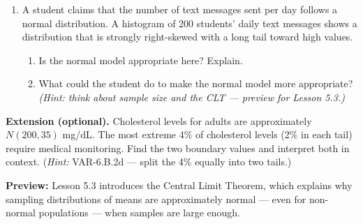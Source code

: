\documentclass[10pt]{article}
\begin{document}
\begin{enumerate}
  \boxguard[22]
  \item A student claims that the number of text messages sent per day follows a normal
        distribution. A histogram of 200 students' daily text messages shows a
        distribution that is strongly right-skewed with a long tail toward high values.
        \begin{enumerate}[label=\alph*.]
          \item Is the normal model appropriate here? Explain.
          \boxguard[17]
          \item What could the student do to make the normal model more appropriate?
                \textit{(Hint: think about sample size and the CLT --- preview for
                Lesson 5.3.)}
        \end{enumerate}

\end{enumerate}

\begin{extensionbox}
\textbf{Extension (optional).}
Cholesterol levels for adults are approximately $N(200, 35)$ mg/dL. The most extreme
4\% of cholesterol levels (2\% in each tail) require medical monitoring. Find the
two boundary values and interpret both in context. (\textit{Hint:} VAR-6.B.2d ---
split the 4\% equally into two tails.)
\end{extensionbox}

\begin{reflectionbox}
\textbf{Preview:} Lesson 5.3 introduces the Central Limit Theorem, which explains why
sampling distributions of means are approximately normal --- even for non-normal
populations --- when samples are large enough.
\end{reflectionbox}
\end{document}
